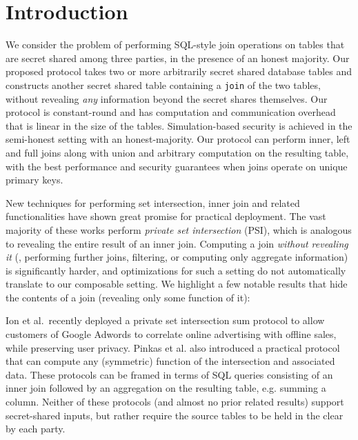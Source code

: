 \section{Introduction}

We consider the problem of performing SQL-style join operations on tables that are secret shared among three parties, in the presence of an honest majority. Our proposed protocol takes two or more arbitrarily secret shared database tables and constructs another secret shared table containing a \texttt{join} of the two tables, without revealing \emph{any} information beyond the secret shares themselves. Our protocol is constant-round and  has computation and communication overhead that is linear in the size of the tables. Simulation-based security is achieved in the semi-honest setting with an honest-majority. Our protocol can perform inner, left and full joins along with union and arbitrary computation on the resulting table, with the best performance and security guarantees when joins operate on unique primary keys.

New techniques \cite{usenix:PSZ14,USENIX:PSSZ15,PSZ16,CCS:KKRT16,PSWW18,CLR17,CHLR18,cryptoeprint:2017:738,RA17,KLSAP17,OOS17,KMPRT17} for performing set intersection, inner join and related functionalities have shown great promise for practical deployment. 
The vast majority of these works perform {\em private set intersection} (PSI), which is analogous to revealing the entire result of an inner join.
Computing a join {\em without revealing it} (\ie, performing further joins, filtering, or computing only aggregate information) is significantly harder, and optimizations for such a setting do not automatically translate to our composable setting.
We highlight a few notable results that hide the contents of a join (revealing only some function of it):

Ion et al.\ recently deployed a private set intersection sum protocol \cite{cryptoeprint:2017:738} to allow customers of Google Adwords to correlate online advertising with offline sales, while preserving user privacy. Pinkas et al. \cite{PSWW18} also introduced a practical protocol that can compute any (symmetric) function of the intersection and associated data. These protocols can be framed in terms of SQL queries consisting of an inner join followed by an aggregation on the resulting table, e.g. summing a column.  
Neither of these protocols (and almost no prior related results) support secret-shared inputs, but rather require the source tables to be held in the clear by each party.

